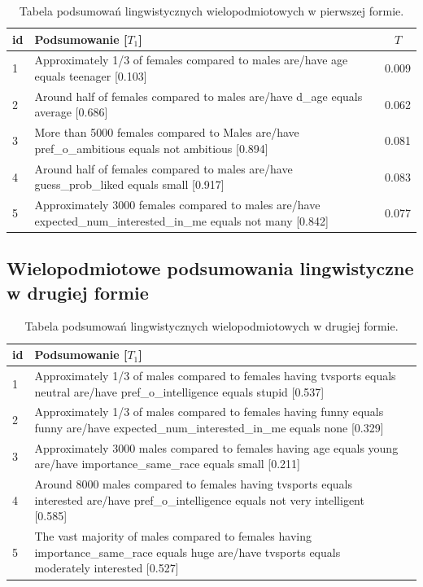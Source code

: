\documentclass{classrep}
\begin{document}
\begin{center}
  \begin{table}[H]
    \begin{tabularx}{\textwidth}{lXc}
    
    id & Podsumowanie [$T_1$] & $T$ \\ \hline 
  
    1 & Approximately 1/3 of females compared to males are/have age equals teenager [0.103] &  0.009 \\\hline
    2 & Around half of females compared to males are/have d\_age equals average [0.686] & 0.062 \\  \hline
    3 & More than 5000 females compared to Males are/have pref\_o\_ambitious equals not ambitious [0.894] & 0.081 \\ \hline
    4 & Around half of females compared to males are/have guess\_prob\_liked equals small [0.917] & 0.083\\ \hline
    5 & Approximately 3000 females compared to males are/have expected\_num\_interested\_in\_me equals not many [0.842] &0.077 \\ \hline
  \end{tabularx}
  \caption{Tabela podsumowań lingwistycznych wielopodmiotowych w pierwszej formie.}
\end{table}
\end{center}

\subsection{Wielopodmiotowe podsumowania lingwistyczne w drugiej formie}

\begin{center}
  \begin{table}[H]
    \begin{tabularx}{\textwidth}{lXc}
    
    id & Podsumowanie [$T_1$]\\ \hline 
  
    1 & Approximately 1/3 of males compared to females having tvsports equals neutral are/have pref\_o\_intelligence equals stupid [0.537] \\\hline
    2 & Approximately 1/3 of males compared to females having funny equals funny are/have expected\_num\_interested\_in\_me equals none [0.329]\\  \hline
    3 & Approximately 3000 males compared to females having age equals young are/have importance\_same\_race equals small [0.211] \\ \hline
    4 & Around 8000 males compared to females having tvsports equals interested are/have pref\_o\_intelligence equals not very intelligent [0.585]\\ \hline
    5 & The vast majority of males compared to females having importance\_same\_race equals huge are/have tvsports equals moderately interested [0.527]\\ \hline
  \end{tabularx}
  \caption{Tabela podsumowań lingwistycznych wielopodmiotowych w drugiej formie.}
\end{table}
\end{center}
\end{document}

